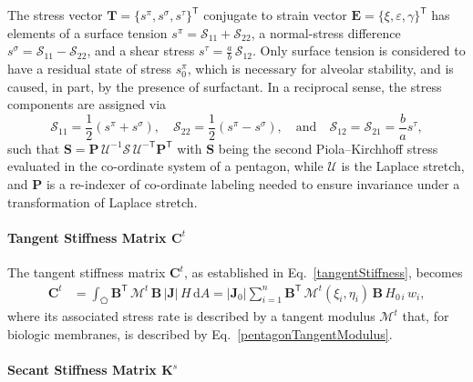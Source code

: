 The stress vector $\boldsymbol{T} = \{ s^{\pi}, s^{\sigma}, s^{\tau} \}^{\mathsf{T}}$ conjugate to strain vector $\boldsymbol{E} = \{ \xi, \varepsilon, \gamma \}^{\mathsf{T}}$ has elements of a surface tension $s^{\pi} = \mathcal{S}_{11} + \mathcal{S}_{22}$, a normal-stress difference $s^{\sigma} = \mathcal{S}_{11} - \mathcal{S}_{22}$, and a shear stress $s^{\tau} = \tfrac{a}{b} \, \mathcal{S}_{12}$.  Only surface tension is considered to have a residual state of stress $s^{\pi}_0$, which is necessary for alveolar stability, and is caused, in part, by the presence of surfactant.  In a reciprocal sense, the stress components are assigned via 
\begin{equation}
    \mathcal{S}_{11} = \frac{1}{2} ( s^{\pi} + s^{\sigma} ), \quad \mathcal{S}_{22} = \frac{1}{2} ( s^{\pi} - s^{\sigma} ) ,
    \quad \text{and} \quad
    \mathcal{S}_{12} = \mathcal{S}_{21} = \frac{b}{a} s^{\tau} ,
\end{equation} 
such that $\mathbf{S} = \mathbf{P} \, \boldsymbol{\mathcal{U}}^{-1} \boldsymbol{\mathcal{S}} \, \boldsymbol{\mathcal{U}}^{-\mathsf{T}} \mathbf{P}^{\mathsf{T}}$ with $\mathbf{S}$ being the second Piola--Kirchhoff stress evaluated in the co-ordinate system of a pentagon, while $\boldsymbol{\mathcal{U}}$ is the Laplace stretch, and $\mathbf{P}$ is a re-indexer of co-ordinate labeling needed to ensure invariance under a transformation of Laplace stretch.


\paragraph{Tangent Stiffness Matrix $\mathbf{C}^t$}

The tangent stiffness matrix $\mathbf{C}^t$, as established in Eq.~\ref{tangentStiffness}, becomes 
\begin{equation}
	\begin{aligned}
		\mathbf{C}^t & =\int_{\pentagon} \mathbf{B}^{\mathsf{T}} \,  \boldsymbol{\mathcal{M}}^t \, \mathbf{B} \, |\mathbf{J}|  \, H \,  \mathrm{d} A
		= |\mathbf{J}_0| \sum_{i=1}^{n}   \mathbf{B}^{\mathsf{T}} \, \boldsymbol{\mathcal{M}}^t (\xi_i, \eta_i) \, \mathbf{B} \, H_{0\,i} \, w_i ,
	\end{aligned}
\end{equation} 
where its associated stress rate is described by a tangent modulus $\boldsymbol{\mathcal{M}}^{t}$ that, for biologic membranes, is described by Eq.~\ref{pentagonTangentModulus}.

\paragraph{Secant Stiffness Matrix $\mathbf{K}^s$}

